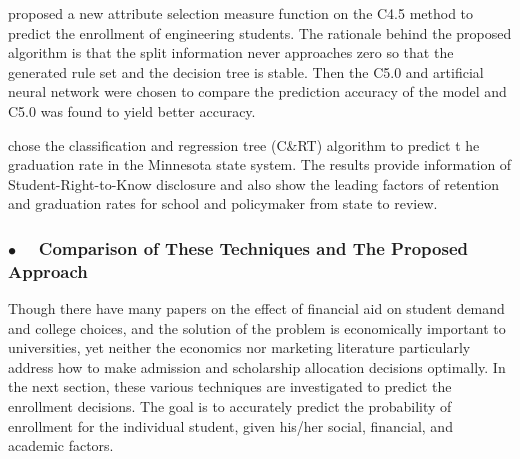 \documentclass[12pt,english]{report}
\begin{document}
\citet{dt_enroll_india} proposed a new attribute selection measure function on
the C4.5 method
to predict the enrollment of engineering students. The rationale behind the
proposed algorithm
is that the split information never approaches zero so that the generated rule
set and the
decision tree is stable. Then the C5.0 and artificial neural network were
chosen to compare
the prediction accuracy of the model and C5.0 was found to
yield better accuracy.



\citet{Bailey2006} chose the classification and regression tree (C\&RT)
algorithm to 
predict t he graduation rate in the Minnesota state system. The results provide
information 
of Student-Right-to-Know disclosure and also show the leading factors of
retention and 
graduation rates for school and policymaker from state to review.


\subsubsection {$\bullet \quad$ Comparison of These Techniques and The Proposed
Approach}

\vspace{0.25in}
Though there have many papers on the effect of financial aid on student 
demand and college choices, and the solution of the problem is economically 
important to universities, yet neither the economics nor marketing 
literature particularly address how to make admission and scholarship 
allocation decisions optimally. In the next section, these various 
techniques are investigated to predict the enrollment decisions. 
The goal is to accurately predict the probability of enrollment for the 
individual student, given his/her social, financial, and academic factors.

% 
% 
\end{document}

